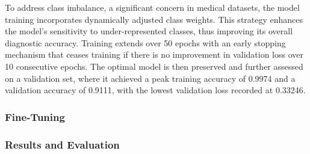 To address class imbalance, a significant concern in medical datasets, the model training incorporates dynamically adjusted class weights. This strategy enhances the model's sensitivity to under-represented classes, thus improving its overall diagnostic accuracy. 
Training extends over 50 epochs with an early stopping mechanism that ceases training if there is no improvement in validation loss over 10 consecutive epochs. The optimal model is then preserved and further assessed on a validation set, where it achieved a peak training accuracy of 0.9974 and a validation accuracy of 0.9111, with the lowest validation loss recorded at 0.33246.


\subsubsection{Fine-Tuning}





\subsubsection{Results and Evaluation}


